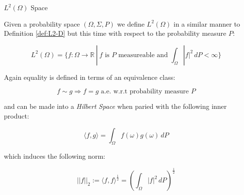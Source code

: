 \begin{definition}\label{def:L2-Omega}
    $L^2(\Omega)$ Space

    Given a probability space $(\Omega, \Sigma, P)$ we define $L^2(\Omega)$ in
    a similar manner to Definition \ref{def:L2-D} but this time with respect to
    the probability measure $P$:

    \begin{equation}\label{eq:L2-Omega}
        L^2(\Omega) = \{f: \Omega \rightarrow \mathbb{R}\ |\
            f \text{ is } P \text{ measureable and }
            \int_\Omega|f|^2\, dP < \infty \}
    \end{equation}

    Again equality is defined in terms of an equivalence class:

    \[
        f \sim g \Rightarrow f = g \text{ a.e. w.r.t probability measure } P
    \]

    and can be made into a \textit{Hilbert Space} when paried with the
    following inner product:

    \begin{equation}\label{eq:L2-Omega-inner-prod}
        \langle f, g \rangle = \int_\Omega f(\omega)g(\omega)\, dP
    \end{equation}

    which induces the following norm:

    \begin{equation}\label{eq:L2-Omega-norm}
        ||f||_2 := \langle f, f\rangle^{\frac{1}{2}}
                 = \left(\int_\Omega|f|^2\, dP\right)^{\frac{1}{2}}
    \end{equation}
\end{definition}

